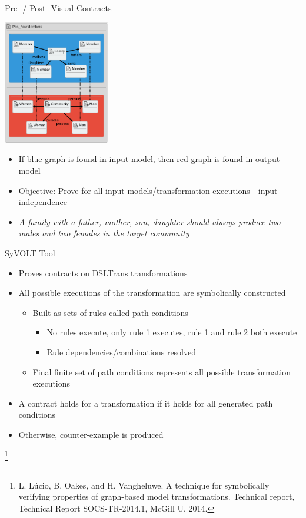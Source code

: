 \documentclass[xcolor=dvipsnames, 12pt, handout]{beamer}
\newcommand\blfootnote[1]{%
  \begingroup
  \renewcommand\thefootnote{}\footnote{#1}%
  \addtocounter{footnote}{-1}%
  \endgroup
}
\begin{document}
\begin{frame}{Pre- / Post- Visual Contracts}
\begin{center}
\includegraphics[width=0.35\textwidth]{figures/Pos_FourMembers}
\end{center}
\pause
\begin{itemize}[<+->]
\item If blue graph is found in input model, then red graph is found in output model
\item Objective: Prove for all input models/transformation executions - input independence
\item \textit{A family with a father, mother, son, daughter
should always produce two males and two females in the
target community}
\end{itemize}
\end{frame}

\begin{frame}{SyVOLT Tool}
\begin{itemize}[<+->]
\item Proves contracts on DSLTrans transformations
\item All possible executions of the transformation are symbolically constructed
\begin{itemize}[<+->]
\item Built as sets of rules called path conditions
\begin{itemize}
\item No rules execute, only rule 1 executes, rule 1 and rule 2 both execute
\item Rule dependencies/combinations resolved
\end{itemize}
\item Final finite set of path conditions represents all possible transformation executions
\end{itemize}
\item A contract holds for a transformation if it holds for all generated path conditions
\item Otherwise, counter-example is produced
\end{itemize}
\blfootnote{L. Lúcio, B. Oakes, and H. Vangheluwe. A technique for symbolically verifying properties of graph-based model transformations. Technical report, Technical Report SOCS-TR-2014.1, McGill U, 2014.}
\end{frame}
\end{document}
